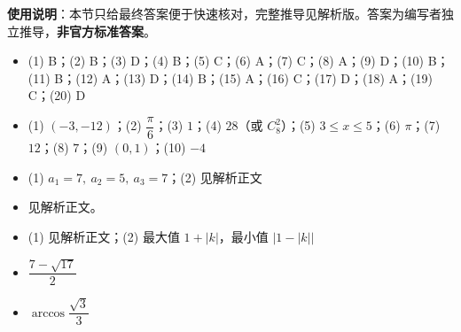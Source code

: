 
\begin{gknotice}
\textbf{使用说明}：本节只给最终答案便于快速核对，完整推导见解析版。答案为编写者独立推导，\textbf{非官方标准答案}。
\end{gknotice}

\begin{itemize}[leftmargin=2.6em]
  \item[\textbf{1.}] (1) B；(2) B；(3) D；(4) B；(5) C；(6) A；(7) C；(8) A；(9) D；(10) B；(11) B；(12) A；(13) D；(14) B；(15) A；(16) C；(17) D；(18) A；(19) C；(20) D
  \item[\textbf{2.}] (1) $(-3,-12)$；(2) $\dfrac\pi6$；(3) $1$；(4) $28$（或 $C_8^2$）；(5) $3\le x\le5$；(6) $\pi$；(7) $12$；(8) $7$；(9) $(0,1)$；(10) $-4$
  \item[\textbf{3.}] (1) $a_1=7,\ a_2=5,\ a_3=7$；(2) 见解析正文
  \item[\textbf{4.}] 见解析正文。
  \item[\textbf{5.}] (1) 见解析正文；(2) 最大值 $1+|k|$，最小值 $|1-|k||$
  \item[\textbf{6.}] $\dfrac{7-\sqrt{17}}2$
  \item[\textbf{7.}] $\arccos\dfrac{\sqrt3}{3}$
\end{itemize}

